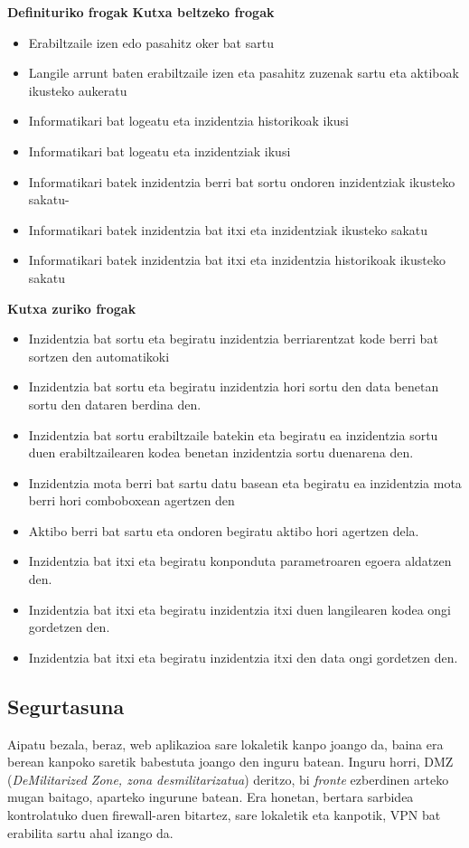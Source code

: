 \noindent \textbf{Definituriko frogak}
\noindent \textbf{Kutxa beltzeko frogak}

\begin{itemize}
\item Erabiltzaile izen edo pasahitz oker bat sartu
\item Langile arrunt baten erabiltzaile izen eta pasahitz zuzenak sartu eta aktiboak ikusteko aukeratu
\item Informatikari bat logeatu eta inzidentzia historikoak ikusi
\item Informatikari bat logeatu eta inzidentziak ikusi
\item Informatikari batek inzidentzia berri bat sortu ondoren inzidentziak ikusteko sakatu-
\item Informatikari batek inzidentzia bat itxi eta inzidentziak ikusteko sakatu
\item Informatikari batek inzidentzia bat itxi eta inzidentzia historikoak ikusteko sakatu
\end{itemize}


\noindent \textbf{Kutxa zuriko frogak}
\begin{itemize}
\item Inzidentzia bat sortu eta begiratu inzidentzia berriarentzat kode berri bat sortzen den automatikoki
\item Inzidentzia bat sortu eta begiratu inzidentzia hori sortu den data benetan sortu den dataren berdina den.
\item Inzidentzia bat sortu erabiltzaile batekin eta begiratu ea inzidentzia sortu duen erabiltzailearen kodea benetan inzidentzia sortu duenarena den.
\item Inzidentzia mota berri bat sartu datu basean eta begiratu ea inzidentzia mota berri hori comboboxean agertzen den
\item Aktibo berri bat sartu eta ondoren begiratu aktibo hori agertzen dela.
\item Inzidentzia bat itxi eta begiratu konponduta parametroaren egoera aldatzen den.
\item Inzidentzia bat itxi eta begiratu inzidentzia itxi duen langilearen kodea ongi gordetzen den.
\item Inzidentzia bat itxi eta begiratu inzidentzia itxi den data ongi gordetzen den.
\end{itemize}

\subsection{Segurtasuna}
\label{sec:dsec}
Aipatu bezala, beraz, web aplikazioa sare lokaletik kanpo joango da, baina era berean kanpoko saretik babestuta joango den inguru batean. Inguru horri, DMZ (\textit{DeMilitarized Zone,  zona desmilitarizatua}) deritzo, bi \textit{fronte} ezberdinen arteko mugan baitago, aparteko ingurune batean. Era honetan, bertara sarbidea kontrolatuko duen firewall-aren bitartez, sare lokaletik eta kanpotik, VPN bat erabilita sartu ahal izango da.

